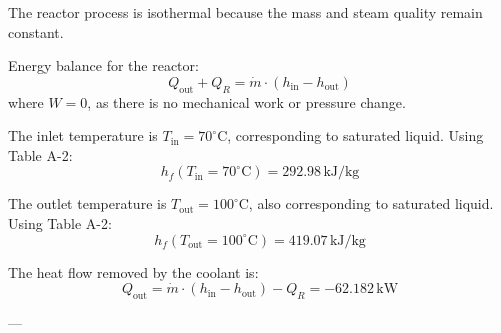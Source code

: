 The reactor process is isothermal because the mass and steam quality remain constant.  

Energy balance for the reactor:  
\[
Q_{\text{out}} + Q_R = \dot{m} \cdot (h_{\text{in}} - h_{\text{out}})
\]  
where \( W = 0 \), as there is no mechanical work or pressure change.  

The inlet temperature is \( T_{\text{in}} = 70^\circ\text{C} \), corresponding to saturated liquid. Using Table A-2:  
\[
h_f(T_{\text{in}} = 70^\circ\text{C}) = 292.98 \, \text{kJ/kg}
\]  

The outlet temperature is \( T_{\text{out}} = 100^\circ\text{C} \), also corresponding to saturated liquid. Using Table A-2:  
\[
h_f(T_{\text{out}} = 100^\circ\text{C}) = 419.07 \, \text{kJ/kg}
\]  

The heat flow removed by the coolant is:  
\[
Q_{\text{out}} = \dot{m} \cdot (h_{\text{in}} - h_{\text{out}}) - Q_R = -62.182 \, \text{kW}
\]  

---